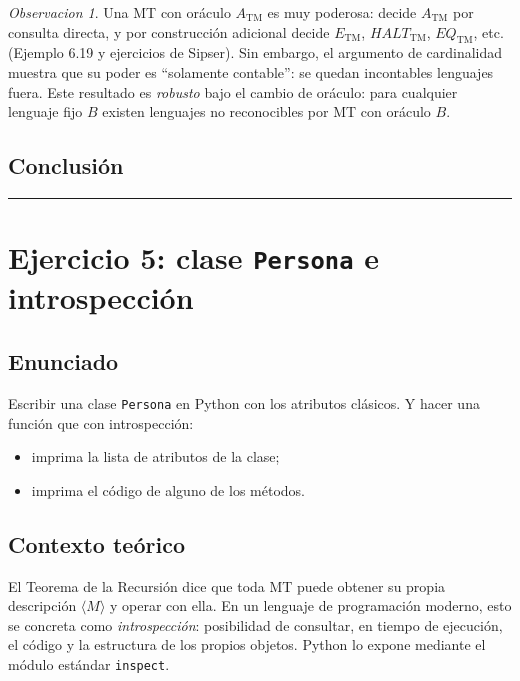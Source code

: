 \documentclass[11pt,a4paper]{article}
\theoremstyle{plain}
\theoremstyle{definition}
\theoremstyle{remark}
\newtheorem*{observacion}{Observacion}
\newcommand{\TM}{\mathrm{TM}}
\newcommand{\enc}[1]{\langle #1\rangle}
\newcommand{\lang}{\mathcal{L}}
\newcommand{\Sstar}{\Sigma^{*}}
\newcommand{\ATM}{A_{\TM}}
\newcommand{\HALT}{\mathit{HALT}_{\TM}}
\newcommand{\ETM}{E_{\TM}}
\begin{document}
\begin{observacion}
Una MT con or\'aculo $\ATM$ es muy poderosa: decide $\ATM$ por consulta
directa, y por construcci\'on adicional decide $\ETM$, $\HALT$, $\mathit{EQ}_{\TM}$, etc.
(Ejemplo 6.19 y ejercicios de Sipser). Sin embargo, el argumento de
cardinalidad muestra que su poder es ``solamente contable'': se quedan
incontables lenguajes fuera. Este resultado es \emph{robusto} bajo el cambio
de or\'aculo: para cualquier lenguaje fijo $B$ existen lenguajes no
reconocibles por MT con or\'aculo $B$.
\end{observacion}

\subsection*{Conclusi\'on}

\begin{center}\fbox{$\exists L\subseteq\Sstar$ tal que $L\notin\{\lang(M^{\ATM}) : M \text{ es MT}\}$.}\end{center}

\bigskip\hrule\bigskip

\section{Ejercicio 5: clase \texttt{Persona} e introspecci\'on}
\label{sec:ej5}

\subsection*{Enunciado}

Escribir una clase \texttt{Persona} en Python con los atributos cl\'asicos. Y
hacer una funci\'on que con introspecci\'on:
\begin{itemize}
  \item imprima la lista de atributos de la clase;
  \item imprima el c\'odigo de alguno de los m\'etodos.
\end{itemize}

\subsection*{Contexto te\'orico}

El Teorema de la Recursi\'on dice que toda MT puede obtener su propia
descripci\'on $\enc{M}$ y operar con ella. En un lenguaje de programaci\'on
moderno, esto se concreta como \emph{introspecci\'on}: posibilidad de
consultar, en tiempo de ejecuci\'on, el c\'odigo y la estructura de los
propios objetos. Python lo expone mediante el m\'odulo est\'andar
\texttt{inspect}.
\end{document}
